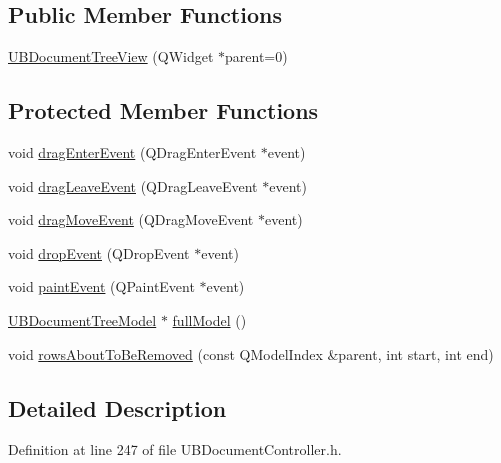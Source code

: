 \subsection*{Public Member Functions}
\begin{DoxyCompactItemize}
\item 
\hyperlink{class_u_b_document_tree_view_a3ef4cb8dc8a2d81efffa042829a244e2}{U\-B\-Document\-Tree\-View} (Q\-Widget $\ast$parent=0)
\end{DoxyCompactItemize}
\subsection*{Protected Member Functions}
\begin{DoxyCompactItemize}
\item 
void \hyperlink{class_u_b_document_tree_view_a28868926ec451f2bb32178e5d53edaa9}{drag\-Enter\-Event} (Q\-Drag\-Enter\-Event $\ast$event)
\item 
void \hyperlink{class_u_b_document_tree_view_a1a0ae3e2f2c94f767e0702680a37906d}{drag\-Leave\-Event} (Q\-Drag\-Leave\-Event $\ast$event)
\item 
void \hyperlink{class_u_b_document_tree_view_a57b90cd037e3dd8bf096a0138d30d5ee}{drag\-Move\-Event} (Q\-Drag\-Move\-Event $\ast$event)
\item 
void \hyperlink{class_u_b_document_tree_view_a8364df11d6b3285ea0684673801b0b6c}{drop\-Event} (Q\-Drop\-Event $\ast$event)
\item 
void \hyperlink{class_u_b_document_tree_view_a2ce720d0c684045f200f2563022139cc}{paint\-Event} (Q\-Paint\-Event $\ast$event)
\item 
\hyperlink{class_u_b_document_tree_model}{U\-B\-Document\-Tree\-Model} $\ast$ \hyperlink{class_u_b_document_tree_view_a2b3206b0a159d6831e7e0138b2b43228}{full\-Model} ()
\item 
void \hyperlink{class_u_b_document_tree_view_a01af3b2ab4276f23082e7b11b57a4581}{rows\-About\-To\-Be\-Removed} (const Q\-Model\-Index \&parent, int start, int end)
\end{DoxyCompactItemize}


\subsection{Detailed Description}


Definition at line 247 of file U\-B\-Document\-Controller.\-h.



